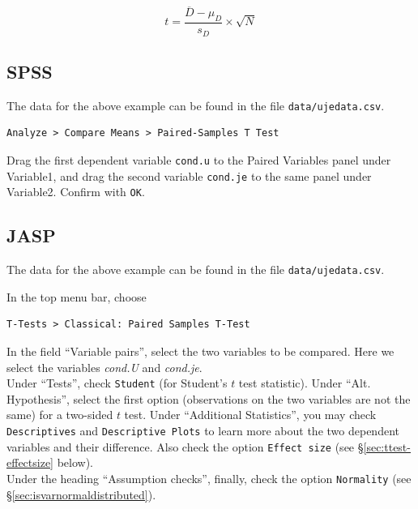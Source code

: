 \documentclass[
]{book}
\begin{document}
\begin{equation}
  \label{eq:t-pairedsamples}
  t = \frac{ \overline{D}-\mu_D} { s_D } \times \sqrt{N}
\end{equation}

\hypertarget{sec:SPSS-ttest-paired}{%
\subsection{SPSS}\label{sec:SPSS-ttest-paired}}

The data for the above example can be found in the file \texttt{data/ujedata.csv}.

\begin{verbatim}
Analyze > Compare Means > Paired-Samples T Test
\end{verbatim}

Drag the first dependent variable \texttt{cond.u} to the Paired
Variables panel under Variable1, and drag the second variable \texttt{cond.je} to
the same panel under Variable2. Confirm with \texttt{OK}.

\hypertarget{sec:JASP-ttest-paired}{%
\subsection{JASP}\label{sec:JASP-ttest-paired}}

The data for the above example can be found in the file \texttt{data/ujedata.csv}.

In the top menu bar, choose

\begin{verbatim}
T-Tests > Classical: Paired Samples T-Test
\end{verbatim}

In the field ``Variable pairs'', select the two variables to be compared. Here we select the variables \emph{cond.U} and \emph{cond.je}.\\
Under ``Tests'', check \texttt{Student} (for Student's \(t\) test statistic). Under ``Alt. Hypothesis'', select the first option (observations on the two variables are not the same) for a two-sided \(t\) test.
Under ``Additional Statistics'', you may check \texttt{Descriptives} and \texttt{Descriptive\ Plots} to learn more about the two dependent variables and their difference. Also check the option \texttt{Effect\ size} (see §\ref{sec:ttest-effectsize} below).\\
Under the heading ``Assumption checks'', finally, check the option \texttt{Normality} (see §\ref{sec:isvarnormaldistributed}).
\end{document}
